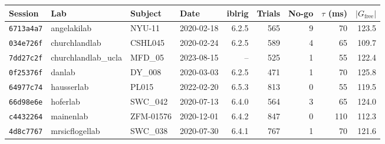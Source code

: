 \begin{tabular}{llllrrrrr}
\toprule
Session & Lab & Subject & Date & iblrig & Trials & No-go & $\tau$ (ms) & $|G_\mathrm{free}|$ \\
\midrule
\texttt{6713a4a7} & angelakilab & NYU-11 & 2020-02-18 & 6.2.5 & 565 & 9 & 70 & 123.5 \\
\texttt{034e726f} & churchlandlab & CSHL045 & 2020-02-24 & 6.2.5 & 589 & 4 & 65 & 109.7 \\
\texttt{7dd27c2f} & churchlandlab\_ucla & MFD\_05 & 2023-08-15 & -- & 525 & 1 & 55 & 122.4 \\
\texttt{0f25376f} & danlab & DY\_008 & 2020-03-03 & 6.2.5 & 471 & 1 & 70 & 125.8 \\
\texttt{64977c74} & hausserlab & PL015 & 2022-02-20 & 6.5.3 & 813 & 0 & 55 & 119.5 \\
\texttt{66d98e6e} & hoferlab & SWC\_042 & 2020-07-13 & 6.4.0 & 564 & 3 & 65 & 124.0 \\
\texttt{c4432264} & mainenlab & ZFM-01576 & 2020-12-01 & 6.4.2 & 847 & 0 & 110 & 112.3 \\
\texttt{4d8c7767} & mrsicflogellab & SWC\_038 & 2020-07-30 & 6.4.1 & 767 & 1 & 70 & 121.6 \\
\bottomrule
\end{tabular}
